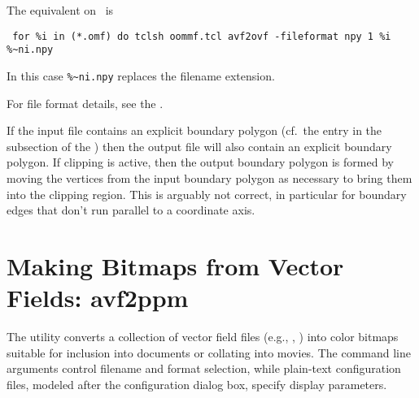 The equivalent on \Windows\ is
\begin{verbatim}
 for %i in (*.omf) do tclsh oommf.tcl avf2ovf -fileformat npy 1 %i %~ni.npy
\end{verbatim}
In this case \verb+%~ni.npy+ replaces the filename extension.

For file format details, see the .


If the input file contains an explicit boundary polygon (cf.\ the
 entry in the  subsection of the {}) then the
output file will also contain an explicit boundary polygon.  If clipping
is active, then the output boundary polygon is formed by moving the
vertices from the input boundary polygon as necessary to bring them into
the clipping region.  This is arguably not correct, in particular for
boundary edges that don't run parallel to a coordinate axis.



\section{Making Bitmaps from Vector Fields:
            avf2ppm}\label{sec:avf2ppm}%
%

The  utility converts a
collection of vector field files (e.g., , ) into color
bitmaps suitable for inclusion into documents or collating into movies.
The command line arguments control filename and format selection, while
plain-text configuration files, modeled after the
{} configuration dialog
box, specify display parameters.

